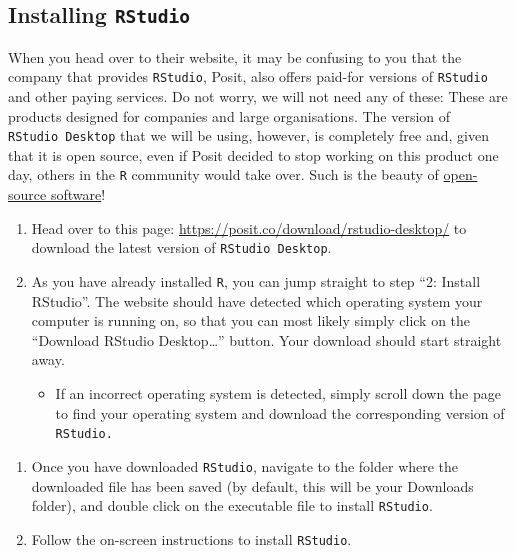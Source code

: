 \documentclass[
  letterpaper,
  DIV=11,
  numbers=noendperiod,
  oneside]{scrreprt}
\providecommand{\tightlist}{%
  \setlength{\itemsep}{0pt}\setlength{\parskip}{0pt}}\usepackage{longtable,booktabs,array}
\begin{document}
\subsection{\texorpdfstring{Installing
\texttt{RStudio}}{Installing RStudio}}\label{installing-rstudio}

When you head over to their website, it may be confusing to you that the
company that provides \texttt{RStudio}, Posit, also offers paid-for
versions of \texttt{RStudio} and other paying services. Do not worry, we
will not need any of these: These are products designed for companies
and large organisations. The version of \texttt{RStudio\ Desktop} that
we will be using, however, is completely free and, given that it is open
source, even if Posit decided to stop working on this product one day,
others in the \texttt{R} community would take over. Such is the beauty
of
\href{https://elenlefoll.github.io/RstatsTextbook/OpenScholarship.html}{open-source
software}! 🤗

\begin{enumerate}
\def\labelenumi{\arabic{enumi}.}
\item
  Head over to this page:
  \url{https://posit.co/download/rstudio-desktop/} to download the
  latest version of \texttt{RStudio\ Desktop}.
\item
  As you have already installed \texttt{R}, you can jump straight to
  step ``2: Install RStudio''. The website should have detected which
  operating system your computer is running on, so that you can most
  likely simply click on the ``Download RStudio Desktop\ldots{}''
  button. Your download should start straight away.

  \begin{itemize}
  \tightlist
  \item
    If an incorrect operating system is detected, simply scroll down the
    page to find your operating system and download the corresponding
    version of \texttt{RStudio.}
  \end{itemize}
\end{enumerate}

\begin{enumerate}
\def\labelenumi{\arabic{enumi}.}
\setcounter{enumi}{2}
\item
  Once you have downloaded \texttt{RStudio}, navigate to the folder
  where the downloaded file has been saved (by default, this will be
  your Downloads folder), and double click on the executable file to
  install \texttt{RStudio}.
\item
  Follow the on-screen instructions to install \texttt{RStudio}.
\end{enumerate}
\end{document}

